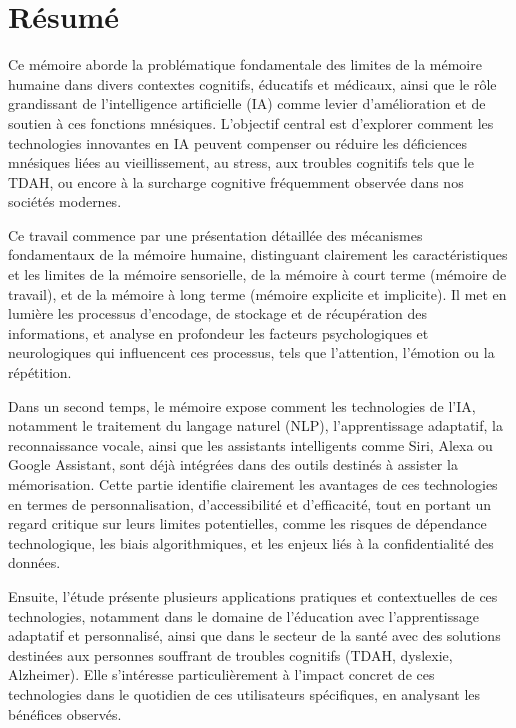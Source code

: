 \documentclass[12pt,a4paper]{report}
\begin{document}
\chapter*{Résumé}

Ce mémoire aborde la problématique fondamentale des limites de la mémoire humaine dans divers contextes cognitifs, éducatifs et médicaux, ainsi que le rôle grandissant de l'intelligence artificielle (IA) comme levier d’amélioration et de soutien à ces fonctions mnésiques. L’objectif central est d’explorer comment les technologies innovantes en IA peuvent compenser ou réduire les déficiences mnésiques liées au vieillissement, au stress, aux troubles cognitifs tels que le TDAH, ou encore à la surcharge cognitive fréquemment observée dans nos sociétés modernes.

Ce travail commence par une présentation détaillée des mécanismes fondamentaux de la mémoire humaine, distinguant clairement les caractéristiques et les limites de la mémoire sensorielle, de la mémoire à court terme (mémoire de travail), et de la mémoire à long terme (mémoire explicite et implicite). Il met en lumière les processus d’encodage, de stockage et de récupération des informations, et analyse en profondeur les facteurs psychologiques et neurologiques qui influencent ces processus, tels que l’attention, l’émotion ou la répétition.

Dans un second temps, le mémoire expose comment les technologies de l’IA, notamment le traitement du langage naturel (NLP), l'apprentissage adaptatif, la reconnaissance vocale, ainsi que les assistants intelligents comme Siri, Alexa ou Google Assistant, sont déjà intégrées dans des outils destinés à assister la mémorisation. Cette partie identifie clairement les avantages de ces technologies en termes de personnalisation, d'accessibilité et d'efficacité, tout en portant un regard critique sur leurs limites potentielles, comme les risques de dépendance technologique, les biais algorithmiques, et les enjeux liés à la confidentialité des données.

Ensuite, l’étude présente plusieurs applications pratiques et contextuelles de ces technologies, notamment dans le domaine de l’éducation avec l’apprentissage adaptatif et personnalisé, ainsi que dans le secteur de la santé avec des solutions destinées aux personnes souffrant de troubles cognitifs (TDAH, dyslexie, Alzheimer). Elle s’intéresse particulièrement à l’impact concret de ces technologies dans le quotidien de ces utilisateurs spécifiques, en analysant les bénéfices observés.
\end{document}
